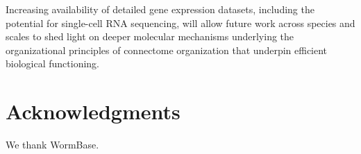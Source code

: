 \documentclass[10pt,letterpaper]{article}
\begin{document}
{Increasing availability of detailed gene expression datasets, including the potential for single-cell RNA sequencing, will allow future work across species and scales to shed light on deeper molecular mechanisms underlying the organizational principles of connectome organization that underpin efficient biological functioning.

\section*{Acknowledgments}
We thank WormBase.

\nolinenumbers

%
%
%







}
\end{document}
